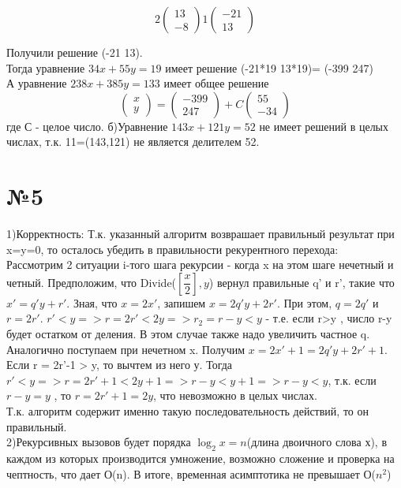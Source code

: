\documentclass[a4paper,12pt]{article} %
\begin{document}
\[2\begin{pmatrix}13\\-8\end{pmatrix}1\begin{pmatrix}-21\\13\end{pmatrix}\]

Получили решение (-21 13).\\
Тогда уравнение $ 34x+55y=19 $ имеет решение (-21*19 13*19)= (-399 247)\\
А уравнение $238x+385y=133$ имеет общее решение
 \[
 \begin{pmatrix}x\\y\end{pmatrix}=\begin{pmatrix}-399\\247\end{pmatrix}+C\begin{pmatrix}55\\-34\end{pmatrix}
 \]
 где С - целое  число.
б)Уравнение $ 143x+121y=52 $ не имеет решений в целых числах, т.к. 11=(143,121) не является делителем 52.

\section*{№5}
1)Корректность:
Т.к. указанный алгоритм возврашает правильный результат при x=y=0, то осталось убедить в правильности рекурентного перехода:\\
Рассмотрим 2 ситуации i-того шага рекурсии - когда x на этом шаге нечетный и четный. Предположим, что Divide($[\dfrac{x}{2}], y$) вернул правильные q' и r', такие что 
$x' = q'y+r'$. Зная, что 
$x=2x' $, запишем $x=2q'y+2r'$. При этом, $q=2q'$ и $ r=2r'$. $r'<y => r=2r' < 2y => r_{2}=r-y<y$ - т.е. если r>y , число r-y будет остатком от деления. В этом случае также надо увеличить частное q. Аналогично поступаем при нечетном x. 
Получим $x=2x'+1=2q'y+2r'+1$. Если r = 2r'-1 > y, то вычтем из него у. Тогда $
r'<y => r=2r'+1 < 2y+1 => r-y < y+1 => r-y < y $, т.к. если $ r-y=y $ , то $r=2r'+1=2y$, что невозможно в целых числах.\\
Т.к. алгоритм содержит именно такую последовательность действий, то он правильный.\\
2)Рекурсивных вызовов будет порядка $ \log_{2}{x} =  n $(длина двоичного слова х), в каждом из которых производится умножение, возможно сложение и проверка на чептность, что дает О(n). В итоге, временная асимптотика не превышает	 О($n^{2}$) 
\end{document}

